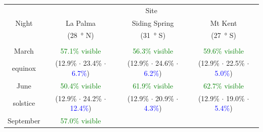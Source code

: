 \begin{colsection}
\begin{colsection}
\begin{table}[t]
    \begin{center}
        \begin{tabular}{c|ccc} %
            \multirow{3}{*}{Night} & \multicolumn{3}{c}{Site} \\
                      & La Palma             & Siding Spring  & Mt Kent \\
                      & (\SI{28}{\degree} N) &  (\SI{31}{\degree} S) &  (\SI{27}{\degree} S) \\
                      \midrule
                      \\
            March     & \textcolor{Green}{57.1\% visible}
                      & \textcolor{Green}{56.3\% visible}
                      & \textcolor{Green}{59.6\% visible}
                      \\
            equinox   & {\scriptsize(\textcolor{BurntOrange}{12.9\%} $\cdot$
                                     \textcolor{NavyBlue}{23.4\%} $\cdot$
                                     \textcolor{Blue}{6.7\%})}
                      & {\scriptsize(\textcolor{BurntOrange}{12.9\%} $\cdot$
                                     \textcolor{NavyBlue}{24.6\%} $\cdot$
                                     \textcolor{Blue}{6.2\%})}
                      & {\scriptsize(\textcolor{BurntOrange}{12.9\%} $\cdot$
                                     \textcolor{NavyBlue}{22.5\%} $\cdot$
                                     \textcolor{Blue}{5.0\%})}
                      \\[0.5cm]
            June      & \textcolor{Green}{50.4\% visible}
                      & \textcolor{Green}{61.9\% visible}
                      & \textcolor{Green}{62.7\% visible}
                      \\
            solstice  & {\scriptsize(\textcolor{BurntOrange}{12.9\%} $\cdot$
                                     \textcolor{NavyBlue}{24.2\%} $\cdot$
                                     \textcolor{Blue}{12.4\%})}
                      & {\scriptsize(\textcolor{BurntOrange}{12.9\%} $\cdot$
                                     \textcolor{NavyBlue}{20.9\%} $\cdot$
                                     \textcolor{Blue}{4.3\%})}
                      & {\scriptsize(\textcolor{BurntOrange}{12.9\%} $\cdot$
                                     \textcolor{NavyBlue}{19.0\%} $\cdot$
                                     \textcolor{Blue}{5.4\%})}
                      \\[0.5cm]
            September & \textcolor{Green}{57.0\% visible}

\end{tabular}
\end{center}
\end{table}
\end{colsection}
\end{colsection}
